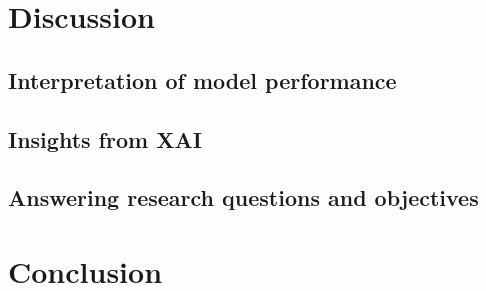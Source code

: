 \documentclass[
  pdftex,
  10pt,
  a4paper,
  oneside
]{article}
\begin{document}
  

  

  \newpage

  \section{Discussion}\label{sec:5-discussion}
  

  \subsection{Interpretation of model performance}
  
  

  \subsection{Insights from XAI}
  
  
  

  \subsection{Answering research questions and objectives}
  
  
  

  \newpage

  \section{Conclusion}\label{sec:6-conclusion}

  \newpage

  
  

  \newpage

  
\end{document}
